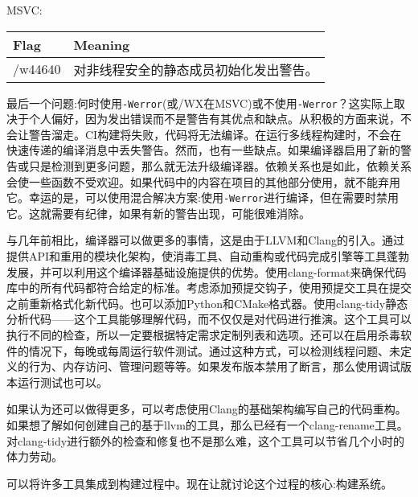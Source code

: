 MSVC:

\begin{table}[H]
	\begin{tabular}{|l|l|}
		\hline
		\textbf{Flag} & \textbf{Meaning}                                      \\ \hline
		/w44640       & 对非线程安全的静态成员初始化发出警告。 \\ \hline
	\end{tabular}
\end{table}

最后一个问题:何时使用\texttt{-Werror}(或/WX在MSVC)或不使用\texttt{-Werror}？这实际上取决于个人偏好，因为发出错误而不是警告有其优点和缺点。从积极的方面来说，不会让警告溜走。CI构建将失败，代码将无法编译。在运行多线程构建时，不会在快速传递的编译消息中丢失警告。然而，也有一些缺点。如果编译器启用了新的警告或只是检测到更多问题，那么就无法升级编译器。依赖关系也是如此，依赖关系会使一些函数不受欢迎。如果代码中的内容在项目的其他部分使用，就不能弃用它。幸运的是，可以使用混合解决方案:使用\texttt{-Werror}进行编译，但在需要时禁用它。这就需要有纪律，如果有新的警告出现，可能很难消除。


与几年前相比，编译器可以做更多的事情，这是由于LLVM和Clang的引入。通过提供API和重用的模块化架构，使消毒工具、自动重构或代码完成引擎等工具蓬勃发展，并可以利用这个编译器基础设施提供的优势。使用clang-format来确保代码库中的所有代码都符合给定的标准。考虑添加预提交钩子，使用预提交工具在提交之前重新格式化新代码。也可以添加Python和CMake格式器。使用clang-tidy静态分析代码——这个工具能够理解代码，而不仅仅是对代码进行推演。这个工具可以执行不同的检查，所以一定要根据特定需求定制列表和选项。还可以在启用杀毒软件的情况下，每晚或每周运行软件测试。通过这种方式，可以检测线程问题、未定义的行为、内存访问、管理问题等等。如果发布版本禁用了断言，那么使用调试版本运行测试也可以。

如果认为还可以做得更多，可以考虑使用Clang的基础架构编写自己的代码重构。如果想了解如何创建自己的基于llvm的工具，那么已经有一个clang-rename工具。对clang-tidy进行额外的检查和修复也不是那么难，这个工具可以节省几个小时的体力劳动。

可以将许多工具集成到构建过程中。现在让就讨论这个过程的核心:构建系统。












